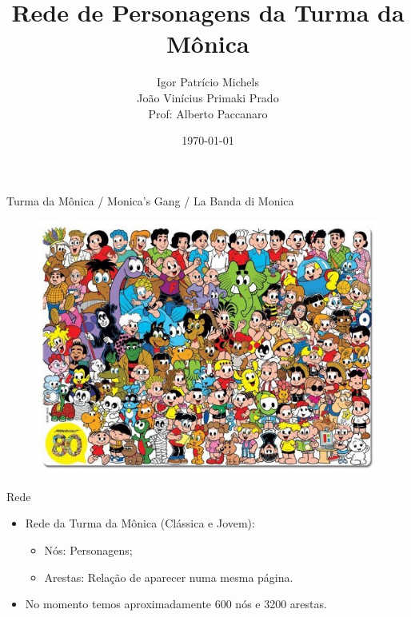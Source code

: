 \documentclass{beamer}
\title[Network Science]
{Rede de Personagens da Turma da Mônica}
\author[João Primaki e Igor Michels]
{
    Igor Patrício Michels \\
    João Vinícius Primaki Prado \\
    Prof: Alberto Paccanaro
}
\institute[]
{
  Escola de Matemática Aplicada \\
  Fundação Getulio Vargas
}
\date[\today]
{\today}
\begin{document}
\begin{frame}
\titlepage
\end{frame} %

\begin{frame}{Turma da Mônica / Monica's Gang / La Banda di Monica}
\begin{figure}
    \centering
    \includegraphics[scale = 0.45]{img/tdm.jpg}
\end{figure}
\end{frame}

\begin{frame}{Rede}
\begin{itemize}
    \item Rede da Turma da Mônica (Clássica e Jovem):
    \begin{itemize}
        \vspace{12pt}
        \item Nós: Personagens;
        \vspace{12pt}
        \item Arestas: Relação de aparecer numa mesma página.
    \end{itemize}
    \vspace{24pt}
        
    \item No momento temos aproximadamente 600 nós e 3200 arestas.
\end{itemize}
\end{frame}
\end{document}
